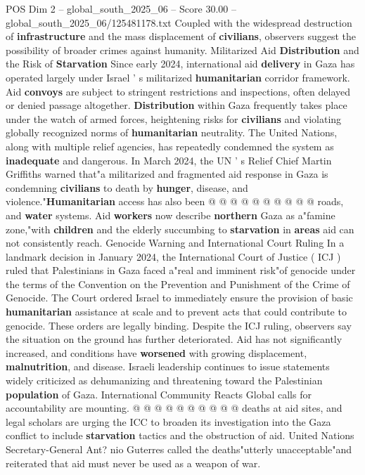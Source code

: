 \begin{textsample}{POS Dim 2 – global\_south\_2025\_06 – Score 30.00 – global\_south\_2025\_06/125481178.txt}
Coupled with the widespread destruction of \textbf{infrastructure} and the mass displacement of \textbf{civilians}, observers suggest the possibility of broader crimes against humanity.
Militarized Aid \textbf{Distribution} and the Risk of \textbf{Starvation} Since early 2024, international aid \textbf{delivery} in Gaza has operated largely under Israel ' s militarized \textbf{humanitarian} corridor framework.
Aid \textbf{convoys} are subject to stringent restrictions and inspections, often delayed or denied passage altogether. \textbf{Distribution} within Gaza frequently takes place under the watch of armed forces, heightening risks for \textbf{civilians} and violating globally recognized norms of \textbf{humanitarian} neutrality.
The United Nations, along with multiple relief agencies, has repeatedly condemned the system as \textbf{inadequate} and dangerous.
In March 2024, the UN ' s Relief Chief Martin Griffiths warned that"a militarized and fragmented aid response in Gaza is condemning \textbf{civilians} to death by \textbf{hunger}, disease, and violence."\textbf{Humanitarian} access has also been @ @ @ @ @ @ @ @ @ @ roads, and \textbf{water} systems.
Aid \textbf{workers} now describe \textbf{northern} Gaza as a"famine zone,"with \textbf{children} and the elderly succumbing to \textbf{starvation} in \textbf{areas} aid can not consistently reach.
Genocide Warning and International Court Ruling In a landmark decision in January 2024, the International Court of Justice ( ICJ ) ruled that Palestinians in Gaza faced a"real and imminent risk"of genocide under the terms of the Convention on the Prevention and Punishment of the Crime of Genocide.
The Court ordered Israel to immediately ensure the provision of basic \textbf{humanitarian} assistance at scale and to prevent acts that could contribute to genocide.
These orders are legally binding.
Despite the ICJ ruling, observers say the situation on the ground has further deteriorated.
Aid has not significantly increased, and conditions have \textbf{worsened} with growing displacement, \textbf{malnutrition}, and disease.
Israeli leadership continues to issue statements widely criticized as dehumanizing and threatening toward the Palestinian \textbf{population} of Gaza.
International Community Reacts Global calls for accountability are mounting. @ @ @ @ @ @ @ @ @ @ deaths at aid sites, and legal scholars are urging the ICC to broaden its investigation into the Gaza conflict to include \textbf{starvation} tactics and the obstruction of aid.
United Nations Secretary-General Ant? nio Guterres called the deaths"utterly unacceptable"and reiterated that aid must never be used as a weapon of war.

\end{textsample}
